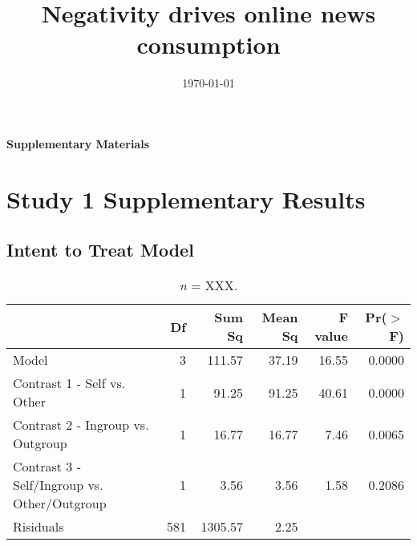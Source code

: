 \documentclass[12pt,]{article}
\title{Negativity drives online news consumption}
\author{}
\date{\today}
\begin{document}

\sloppy
\raggedbottom




\appendix
\begin{center}
\LARGE\bfseries Supplementary Materials
\end{center}

\tableofcontents






\newpage
\section{Study 1 Supplementary Results}
\label{appendix:study1}


\subsection{Intent to Treat Model}
\label{appendix:itt1}

\begin{table}[ht]
\centering
\begin{tabular}{lrrrrr}
  \hline
 & Df & Sum Sq & Mean Sq & F value & Pr($>$F) \\ 
  \hline
Model & 3 & 111.57 & 37.19 & 16.55 & 0.0000 \\ 
  Contrast 1 - Self vs. Other & 1 & 91.25 & 91.25 & 40.61 & 0.0000 \\ 
  Contrast 2 - Ingroup vs. Outgroup & 1 & 16.77 & 16.77 & 7.46 & 0.0065 \\ 
  Contrast 3 - Self/Ingroup vs. Other/Outgroup & 1 & 3.56 & 3.56 & 1.58 & 0.2086 \\ 
  Risiduals & 581 & 1305.57 & 2.25 &  &  \\ 
   \hline
\end{tabular}
\caption{{\color{red}{INCOMPLETE: Intent-to-treat model}} \emph{n} = XXX. } 
\label{ITT1}
\end{table}
\end{document}
